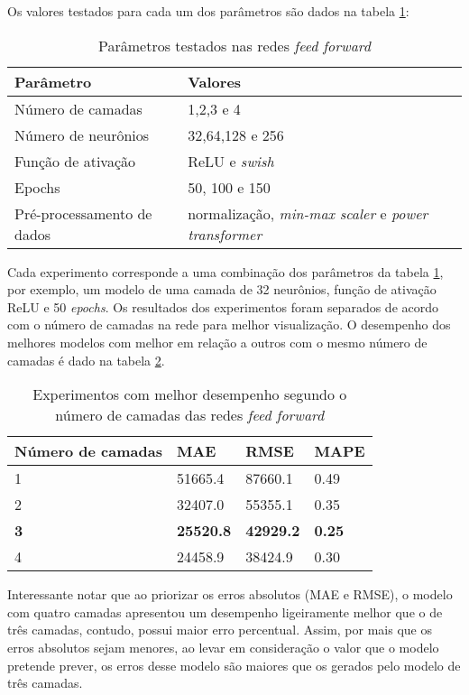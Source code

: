 Os valores testados para cada um dos parâmetros são dados na tabela \ref{tab:param-mlp}:

\begin{table}[H]
    \centering
    \begin{tabular}{ll}
        \toprule
        Parâmetro           & Valores   \\
        \midrule
        Número de camadas   & 1,2,3 e 4 \\
        Número de neurônios & 32,64,128 e 256       \\
        Função de ativação  & ReLU e \textit{swish}  \\
        Epochs              & 50, 100 e 150      \\
        Pré-processamento de dados & normalização, \textit{min-max scaler} e \textit{power transformer}\\
        \bottomrule
    \end{tabular}
    \caption{Parâmetros testados nas redes \textit{feed forward}}
    \label{tab:param-mlp}
\end{table} 

Cada experimento corresponde a uma combinação dos parâmetros 
da tabela \ref{tab:param-mlp}, por exemplo, um modelo de uma 
camada de 32 neurônios, função de ativação ReLU e 50 \textit{epochs}.
Os resultados dos experimentos foram separados de acordo 
com o número de camadas na rede para melhor visualização. O desempenho dos 
melhores modelos com melhor em relação a outros com o mesmo número de 
camadas é dado na tabela \ref{tab:res-mlp}.

\begin{table}[H]
    \centering
    \caption{Experimentos com melhor desempenho segundo o número de camadas das redes \textit{feed forward}}
    \begin{tabular}{llll}
    \toprule
    Número de camadas  & MAE & RMSE & MAPE \\
    \midrule
    1 & 51665.4  & 87660.1  & 0.49\\
    2 & 32407.0  & 55355.1 & 0.35 \\
    \textbf{3} & \textbf{25520.8}  & \textbf{42929.2} & \textbf{0.25} \\
    4 & 24458.9  & 38424.9 & 0.30 \\
    \bottomrule
    \end{tabular}
    \label{tab:res-mlp}
\end{table}

Interessante notar que ao priorizar os erros absolutos (MAE e RMSE), o modelo 
com quatro camadas apresentou um desempenho ligeiramente
melhor que o de três camadas, contudo, possui maior erro percentual.
Assim, por mais que os erros absolutos sejam menores, ao levar em 
consideração o valor que o modelo pretende prever, os erros desse 
modelo são maiores que os gerados pelo modelo de três camadas. 

